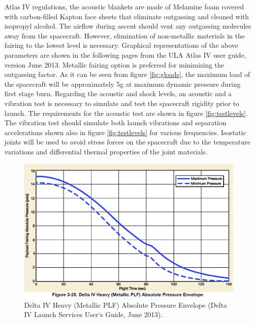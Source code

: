 Atlas IV regulations, the acoustic blankets are made of Melamine foam covered with carbon-filled Kapton face sheets that eliminate outgassing and cleaned with isopropyl alcohol. The airflow during ascent should vent any outgassing molecules away from the spacecraft. However, elimination of non-metallic materials in the fairing to the lowest level is necessary. Graphical representations of the above parameters are shown in the following pages from the ULA Atlas IV user guide, version June 2013. Metallic fairing option is preferred for minimizing the outgassing factor. As it can be seen from figure \ref{fig:gloads}, the maximum load of the spacecraft will be approximately 5g at maximum dynamic pressure during first stage burn. Regarding the acoustic and shock levels, an acoustic and a vibration test is necessary to simulate and test the spacecraft rigidity prior to launch. The requirements for the acoustic test are shown in figure \ref{fig:testlevels}. The vibration test should simulate both launch vibrations and separation accelerations shown also in figure \ref{fig:testlevels} for various frequencies. Isostatic joints will be used to avoid stress forces on the spacecraft due to the temperature variations and differential thermal properties of the joint materials. 

\begin{figure}[htb]
\centering
\includegraphics[scale=0.3]{figures/Orbiter/pressure.png}
\caption{Delta IV Heavy (Metallic PLF) Absolute Pressure Envelope (Delta IV Launch Services User‘s Guide, June 2013).\cite{Atlasm}}
\end{figure}

